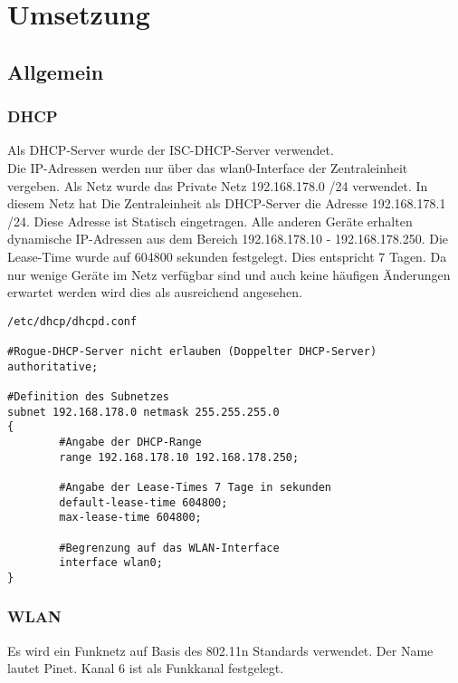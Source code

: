 \chapter{Umsetzung}

\section{Allgemein}

\subsection{DHCP}

Als DHCP-Server wurde der ISC-DHCP-Server verwendet.\\
Die IP-Adressen werden nur über das wlan0-Interface der Zentraleinheit vergeben.
Als Netz wurde das Private Netz 192.168.178.0 /24 verwendet. In diesem Netz hat
Die Zentraleinheit als DHCP-Server die Adresse 192.168.178.1 /24. Diese Adresse
ist Statisch eingetragen. Alle anderen Geräte erhalten dynamische IP-Adressen
aus dem Bereich 192.168.178.10 - 192.168.178.250. Die Lease-Time wurde auf
604800 sekunden festgelegt. Dies entspricht 7 Tagen. Da nur wenige Geräte im
Netz verfügbar sind und auch keine häufigen Änderungen erwartet werden wird dies
als ausreichend angesehen.

\begin{verbatim}
/etc/dhcp/dhcpd.conf

#Rogue-DHCP-Server nicht erlauben (Doppelter DHCP-Server)
authoritative;

#Definition des Subnetzes
subnet 192.168.178.0 netmask 255.255.255.0
{
        #Angabe der DHCP-Range
        range 192.168.178.10 192.168.178.250;

        #Angabe der Lease-Times 7 Tage in sekunden
        default-lease-time 604800;
        max-lease-time 604800;

        #Begrenzung auf das WLAN-Interface
        interface wlan0;
}

\end{verbatim}

\subsection{WLAN}

Es wird ein Funknetz auf Basis des 802.11n Standards verwendet. Der Name lautet
Pinet. Kanal 6 ist als Funkkanal festgelegt.

